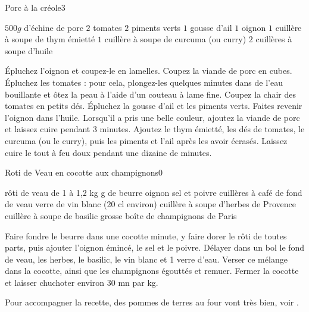 \begin{recette}{Porc à la créole}{3}{}{}%
\begin{ingredients}
\ingredient $500 \unit{g}$ d'échine de porc
\ingredient $2$ tomates
\ingredient $2$ piments verts
\ingredient $1$ gousse d'ail
\ingredient $1$ oignon
\ingredient $1$ cuillère à soupe de thym émietté
\ingredient $1$ cuillère à soupe de curcuma (ou curry)
\ingredient $2$ cuillères à soupe d'huile
\end{ingredients}

\begin{preparation}
\etape Épluchez l'oignon et coupez-le en lamelles.
\etape Coupez la viande de porc en cubes.
\etape Épluchez les tomates : pour cela, plongez-les quelques minutes dans de l'eau bouillante et ôtez la peau à l'aide d'un couteau à lame fine.
\etape Coupez la chair des tomates en petits dés.
\etape Épluchez la gousse d'ail et les piments verts.
\etape Faites revenir l'oignon dans l'huile.
\etape Lorsqu'il a pris une belle couleur, ajoutez la viande de porc et laissez cuire pendant 3 minutes.
\etape Ajoutez le thym émietté, les dés de tomates, le curcuma (ou le curry), puis les piments et l'ail après les avoir écrasés.
\etape Laissez cuire le tout à feu doux pendant une dizaine de minutes.
\end{preparation}

\end{recette}

\begin{recette}{Roti de Veau en cocotte aux champignons}{0}{}{}
\begin{ingredients}
 rôti de veau de 1 à 1,2 kg
 g de beurre
 oignon
\ingredient sel et poivre
 cuillères à café de fond de veau
 verre de vin blanc (20 cl environ)
 cuillère à soupe d'herbes de Provence
 cuillère à soupe de basilic
 grosse boîte de champignons de Paris
\end{ingredients}

\begin{preparation}
\etape Faire fondre le beurre dans une cocotte minute, y faire dorer le rôti de toutes parts, puis ajouter l'oignon émincé, le sel et le poivre.
\etape Délayer dans un bol le fond de veau, les herbes, le basilic, le vin blanc et 1 verre d'eau. Verser ce mélange dans la cocotte, ainsi que les champignons égouttés et remuer.
\etape Fermer la cocotte et laisser chuchoter environ 30 mn par kg.
\end{preparation}

\begin{remarque}
Pour accompagner la recette, des pommes de terres au four vont très bien, voir .
\end{remarque}
\end{recette}

